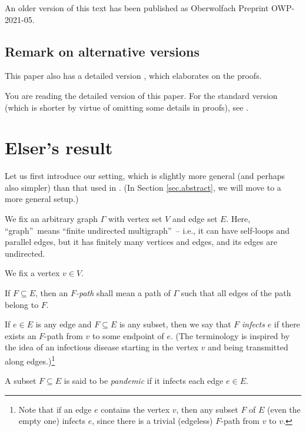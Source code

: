 \documentclass[numbers=enddot,12pt,final,onecolumn]{scrartcl}%
\theoremstyle{definition}
\newenvironment{verlong}{}{}
\newenvironment{vershort}{}{}
\begin{document}
An older version of this text has been published as Oberwolfach Preprint OWP-2021-05.

\subsection*{Remark on alternative versions}

\begin{vershort}
This paper also has a detailed version \cite{verlong}, which elaborates on the proofs.
\end{vershort}

\begin{verlong}
You are reading the detailed version of this paper. For the standard version
(which is shorter by virtue of omitting some details in proofs), see
\cite{vershort}.
\end{verlong}

\section{\label{sec.elser}Elser's result}

Let us first introduce our setting, which is slightly more general (and
perhaps also simpler) than that used in \cite{Elser84}. (In Section
\ref{sec.abstract}, we will move to a more general setup.)

We fix an arbitrary graph $\Gamma$ with vertex set $V$ and edge set $E$. Here,
\textquotedblleft graph\textquotedblright\ means \textquotedblleft finite
undirected multigraph\textquotedblright\ -- i.e., it can have self-loops and
parallel edges, but it has finitely many vertices and edges, and its edges are undirected.

We fix a vertex $v\in V$.

If $F\subseteq E$, then an $F$\emph{-path} shall mean a path of $\Gamma$ such
that all edges of the path belong to $F$.

If $e\in E$ is any edge and $F\subseteq E$ is any subset, then we say that $F$
\emph{infects }$e$ if there exists an $F$-path from $v$ to some endpoint of
$e$. (The terminology is inspired by the idea of an infectious disease
starting in the vertex $v$ and being transmitted along edges.)\footnote{Note
that if an edge $e$ contains the vertex $v$, then any subset $F$ of $E$ (even
the empty one) infects $e$, since there is a trivial (edgeless) $F$-path from
$v$ to $v$.}

A subset $F\subseteq E$ is said to be \emph{pandemic} if it infects each edge
$e\in E$.
\end{document}
